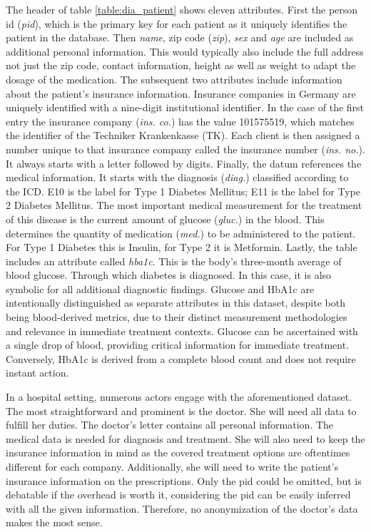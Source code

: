 The header of table \ref{table:dia_patient} shows eleven attributes. First the person id (\textit{pid}), which is the primary key for each patient as it uniquely identifies the patient in the database. Then \textit{name}, zip code (\textit{zip}), \textit{sex} and \textit{age} are included as additional personal information.
This would typically also include the full address not just the zip code, contact information, height as well as weight to adapt the dosage of the medication. The subsequent two attributes include information about the patient's insurance information. 
Insurance companies in Germany are uniquely identified with a nine-digit institutional identifier. In the case of the first entry the insurance company (\textit{ins. co.}) has the value 101575519, which matches the identifier of the Techniker Krankenkasse (TK). 
Each client is then assigned a number unique to that insurance company called the insurance number (\textit{ins. no.}). It always starts with a letter followed by digits. Finally, the datum references the medical information. It starts with the diagnosis (\textit{diag.}) classified according to the \ac*{ICD}. 
E10 is the label for Type 1 Diabetes Mellitus; E11 is the label for Type 2 Diabetes Mellitus. The most important medical measurement for the treatment of this disease is the current amount of glucose (\textit{gluc.}) in the blood. This determines the quantity of medication (\textit{med.}) to be administered to the patient. For Type 1 Diabetes this is Insulin, for Type 2 it is Metformin. 
Lastly, the table includes an attribute called \textit{hba1c}. This is the body's three-month average of blood glucose. Through which diabetes is diagnosed. In this case, it is also symbolic for all additional diagnostic findings. 
Glucose and HbA1c are intentionally distinguished as separate attributes in this dataset, despite both being blood-derived metrics, due to their distinct measurement methodologies and relevance in immediate treatment contexts. Glucose can be ascertained with a single drop of blood, providing critical information for immediate treatment.
Conversely, HbA1c is derived from a complete blood count and does not require instant action. \par

In a hospital setting, numerous actors engage with the aforementioned dataset. The most straightforward and prominent is the doctor. She will need all data to fulfill her duties. The doctor's letter contains all personal information. The medical data is needed for diagnosis and treatment. 
She will also need to keep the insurance information in mind as the covered treatment options are oftentimes different for each company. Additionally, she will need to write the patient's insurance information on the prescriptions. Only the pid could be omitted, but is debatable if the overhead is worth it, considering the pid can be easily inferred with all the given information.
Therefore, no anonymization of the doctor's data makes the most sense. \par


